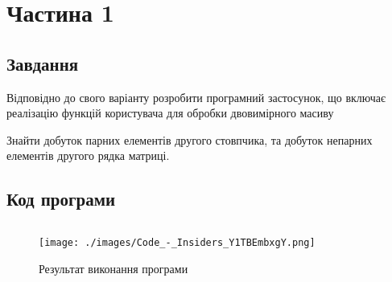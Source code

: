 \section{Частина 1}
\label{sec:task1}

\subsection{Завдання}
\label{subsec:task1_task}

Відповідно до свого варіанту розробити програмний застосунок,
що включає реалізацію функцій користувача
для обробки двовимірного масиву

Знайти добуток парних елементів другого стовпчика, та
добуток непарних елементів другого рядка матриці.

\subsection{Код програми}
\label{subsec:task1_code}
\inputminted{cpp}{../src/task1.cpp}

\begin{figure}[!ht]
    \centering
    \texttt{[image: ./images/Code\_-\_Insiders\_Y1TBEmbxgY.png]}
    \caption{Результат виконання програми}
    \label{fig:task1_exec}
\end{figure}
